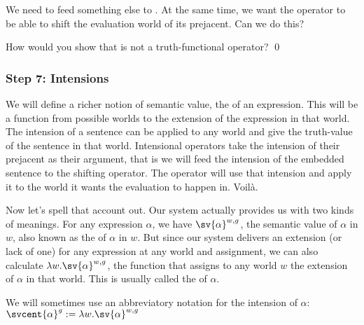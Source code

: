 \enlargethispage{18pt}We need to feed something else to . At the same time, we want the operator to be able to shift the
evaluation world of its prejacent. Can we do this?

\begin{exercise}\enlargethispage{18pt}
  How would you show that  is not a
  truth-functional operator? \qed
\end{exercise}

\subsubsection{Step 7: Intensions} \label{sec:intensions}

We will define a richer notion of semantic value, the  of an
expression. This will be a function from possible worlds to the extension of the
expression in that world. The intension of a sentence can be applied to any
world and give the truth-value of the sentence in that world. Intensional
operators take the intension of their prejacent as their argument, that is we
will feed the intension of the embedded sentence to the shifting operator. The
operator will use that intension and apply it to the world it wants the
evaluation to happen in. Voilà.

\enlargethispage{24pt} %
Now let's spell that account out. Our system actually provides us with two kinds
of meanings. For any expression $\alpha$, we have $\sv{\alpha}^{w,g}$, the
semantic value of $\alpha$ in $w$, also known as the  of
$\alpha$ in $w$. But since our system delivers an extension (or lack of one) for
any expression at any world and assignment, we can also calculate
$\lambda w. \sv{\alpha}^{w,g}$, the function that assigns to any world $w$ the
extension of $\alpha$ in that world. This is usually called the 
of $\alpha$.

\clearpage

We will sometimes use an abbreviatory notation for the intension of $\alpha$:%
\ex{}%
$\svcent{\alpha}^g := \lambda w. \sv{\alpha}^{w,g}$ \xe

